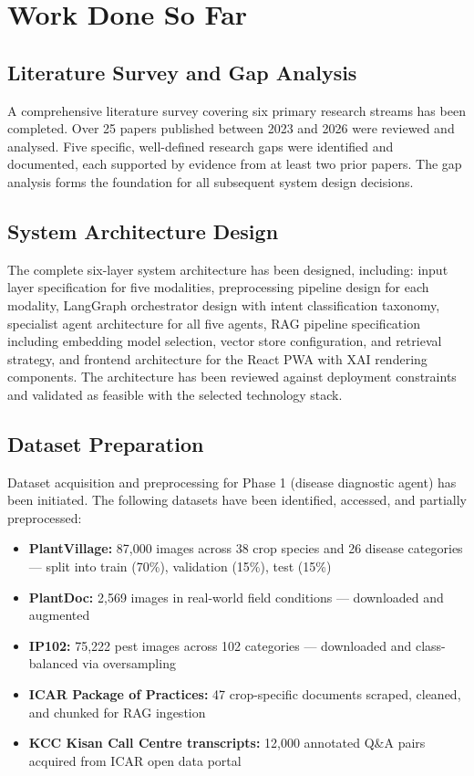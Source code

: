 \documentclass[12pt,a4paper]{article}
\begin{document}
\newpage
\section{Work Done So Far}

\subsection{Literature Survey and Gap Analysis}
A comprehensive literature survey covering six primary research streams has been completed. Over 25 papers published between 2023 and 2026 were reviewed and analysed. Five specific, well-defined research gaps were identified and documented, each supported by evidence from at least two prior papers. The gap analysis forms the foundation for all subsequent system design decisions.

\subsection{System Architecture Design}
The complete six-layer system architecture has been designed, including: input layer specification for five modalities, preprocessing pipeline design for each modality, LangGraph orchestrator design with intent classification taxonomy, specialist agent architecture for all five agents, RAG pipeline specification including embedding model selection, vector store configuration, and retrieval strategy, and frontend architecture for the React PWA with XAI rendering components. The architecture has been reviewed against deployment constraints and validated as feasible with the selected technology stack.

\subsection{Dataset Preparation}
Dataset acquisition and preprocessing for Phase 1 (disease diagnostic agent) has been initiated. The following datasets have been identified, accessed, and partially preprocessed:
\begin{itemize}
    \item \textbf{PlantVillage:} 87,000 images across 38 crop species and 26 disease categories --- split into train (70\%), validation (15\%), test (15\%)
    \item \textbf{PlantDoc:} 2,569 images in real-world field conditions --- downloaded and augmented
    \item \textbf{IP102:} 75,222 pest images across 102 categories --- downloaded and class-balanced via oversampling
    \item \textbf{ICAR Package of Practices:} 47 crop-specific documents scraped, cleaned, and chunked for RAG ingestion
    \item \textbf{KCC Kisan Call Centre transcripts:} 12,000 annotated Q\&A pairs acquired from ICAR open data portal
\end{itemize}
\end{document}
